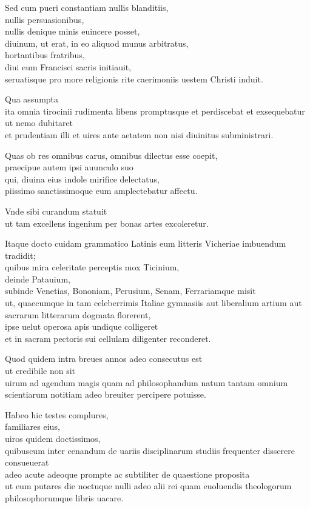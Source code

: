 \documentclass[a5paper,twoside]{article}
\begin{document}
Sed cum pueri constantiam nullis blanditiis, \\
nullis persuasionibus, \\
nullis denique minis euincere posset, \\
diuinum, ut erat, in eo aliquod munus arbitratus, \\
hortantibus fratribus, \\
diui eum Francisci sacris initiauit, \\
seruatisque pro more religionis rite caerimoniis uestem Christi induit. 

Qua assumpta \\
ita omnia tirocinii rudimenta libens promptusque et perdiscebat et exsequebatur \\
ut nemo dubitaret \\
et prudentiam illi et uires ante aetatem non nisi diuinitus subministrari. 

Quas ob res omnibus carus, omnibus dilectus esse coepit, \\
praecipue autem ipsi auunculo suo \\
qui, diuina eius indole mirifice delectatus, \\
piissimo sanctissimoque eum amplectebatur affectu. 

Vnde sibi curandum statuit \\
ut tam excellens ingenium per bonas artes excoleretur. 

Itaque docto cuidam grammatico Latinis eum litteris Vicheriae imbuendum tradidit; \\
quibus mira celeritate perceptis mox Ticinium, \\
deinde Patauium, \\
subinde Venetias, Bononiam, Perusium, Senam, Ferrariamque misit \\
ut, quaecumque in tam celeberrimis Italiae gymnasiis aut liberalium artium aut sacrarum litterarum dogmata florerent, \\
ipse uelut operosa apis undique colligeret \\
et in sacram pectoris sui cellulam diligenter reconderet. 

Quod quidem intra breues annos adeo consecutus est \\
ut credibile non sit \\
uirum ad agendum magis quam ad philosophandum natum tantam omnium scientiarum notitiam adeo breuiter percipere potuisse. 

Habeo hic testes complures, \\
familiares eius, \\
uiros quidem doctissimos, \\
quibuscum inter cenandum de uariis disciplinarum studiis frequenter disserere consueuerat \\
adeo acute adeoque prompte ac subtiliter de quaestione proposita \\
ut eum putares die noctuque nulli adeo alii rei quam euoluendis theologorum philosophorumque libris uacare. 
\end{document}
